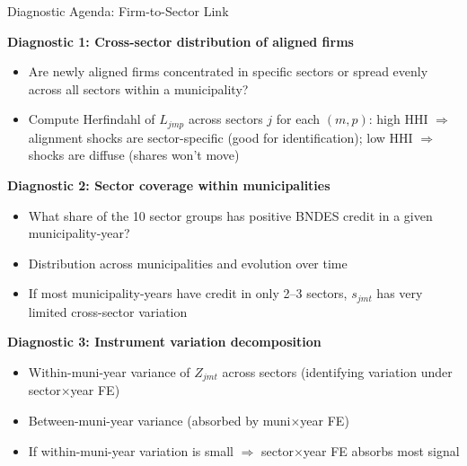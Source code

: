 \documentclass[aspectratio=169,11pt]{beamer}
\begin{document}
\begin{frame}{Diagnostic Agenda: Firm-to-Sector Link}

\textbf{Diagnostic 1: Cross-sector distribution of aligned firms}
\begin{itemize}
    \item Are newly aligned firms concentrated in specific sectors or spread evenly across all sectors within a municipality?
    \item Compute Herfindahl of $L_{jmp}$ across sectors $j$ for each $(m, p)$: high HHI $\Rightarrow$ alignment shocks are sector-specific (good for identification); low HHI $\Rightarrow$ shocks are diffuse (shares won't move)
\end{itemize}

\bigskip

\textbf{Diagnostic 2: Sector coverage within municipalities}
\begin{itemize}
    \item What share of the 10 sector groups has positive BNDES credit in a given municipality-year?
    \item Distribution across municipalities and evolution over time
    \item If most municipality-years have credit in only 2--3 sectors, $s_{jmt}$ has very limited cross-sector variation
\end{itemize}

\bigskip

\textbf{Diagnostic 3: Instrument variation decomposition}
\begin{itemize}
    \item Within-muni-year variance of $Z_{jmt}$ across sectors (identifying variation under sector$\times$year FE)
    \item Between-muni-year variance (absorbed by muni$\times$year FE)
    \item If within-muni-year variation is small $\Rightarrow$ sector$\times$year FE absorbs most signal
\end{itemize}

\end{frame}
\end{document}
